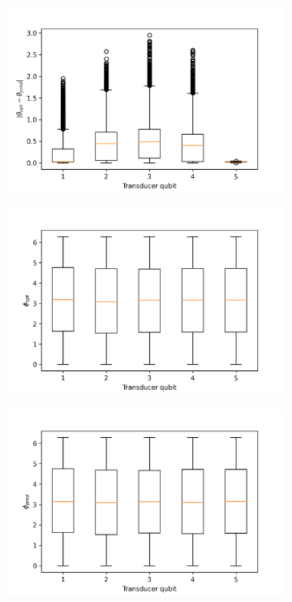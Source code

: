 \begin{figure}
\begin{subfigure}{0.32\textwidth}
	\end{subfigure}
	\begin{subfigure}{0.32\textwidth}
		\centering
		\includegraphics[width=\textwidth]{img/delta_theta_box}
	\end{subfigure}
	\begin{subfigure}{0.32\textwidth}
	\centering
	\includegraphics[width=\textwidth]{img/phi_opt_box}
\end{subfigure}
\begin{subfigure}{0.32\textwidth}
	\centering
	\includegraphics[width=\textwidth]{img/phi_pred_box}

\end{subfigure}
\end{figure}

